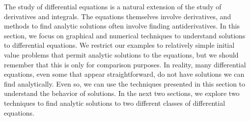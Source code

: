 
The study of differential equations is a natural extension of the study of derivatives and integrals.  The equations themselves involve derivatives, and methods to find analytic solutions often involve finding antiderivatives.   In this section, we focus on graphical and numerical techniques to understand solutions to differential equations.  We restrict our examples to relatively simple initial value problems that permit analytic solutions to the equations, but we should remember that this is only for comparison purposes.  In reality, many differential equations, even some that appear straightforward, do not have solutions we can find analytically.  Even so, we can use the techniques presented in this section to understand the behavior of solutions.  In the next two sections, we explore two techniques to find analytic solutions to two different classes of differential equations.

